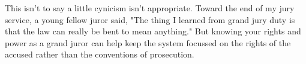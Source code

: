 \documentclass[letterpaper]{article}
\begin{document}
This isn't to say a little cynicism isn't appropriate.
Toward the end of my jury service, a young fellow juror said, "The thing I learned from grand jury duty is that the law can really be bent to mean anything." 
But knowing your rights and power as a grand juror can help keep the system focussed on the rights of the accused rather than the conventions of prosecution.



\theendnotes


 
\end{document}

